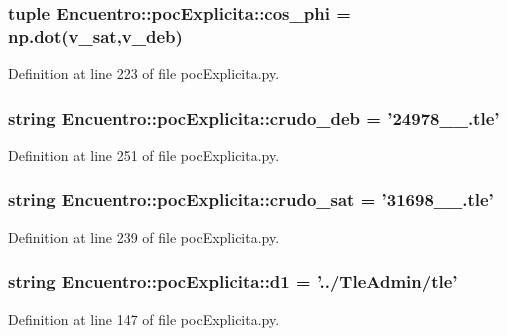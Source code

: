 \subsubsection[{cos\-\_\-phi}]{\setlength{\rightskip}{0pt plus 5cm}tuple {\bf \-Encuentro\-::poc\-Explicita\-::cos\-\_\-phi} = np.\-dot(v\-\_\-sat,v\-\_\-deb)}\label{namespace_encuentro_1_1poc_explicita_a6fbfa27437a7064d705ba018ff939eca}


\-Definition at line 223 of file poc\-Explicita.\-py.

\subsubsection[{crudo\-\_\-deb}]{\setlength{\rightskip}{0pt plus 5cm}string {\bf \-Encuentro\-::poc\-Explicita\-::crudo\-\_\-deb} = '24978\-\_\-\_.\-tle'}\label{namespace_encuentro_1_1poc_explicita_a7487a3ac57d1a4d2f320280a0a19d2da}


\-Definition at line 251 of file poc\-Explicita.\-py.

\subsubsection[{crudo\-\_\-sat}]{\setlength{\rightskip}{0pt plus 5cm}string {\bf \-Encuentro\-::poc\-Explicita\-::crudo\-\_\-sat} = '31698\-\_\-\_.\-tle'}\label{namespace_encuentro_1_1poc_explicita_a1deff3b045a916025d1dfd581c6a8378}


\-Definition at line 239 of file poc\-Explicita.\-py.

\subsubsection[{d1}]{\setlength{\rightskip}{0pt plus 5cm}string {\bf \-Encuentro\-::poc\-Explicita\-::d1} = '../\-Tle\-Admin/tle'}\label{namespace_encuentro_1_1poc_explicita_ad28b3a43dc771a37740531eee0c0de0e}


\-Definition at line 147 of file poc\-Explicita.\-py.

